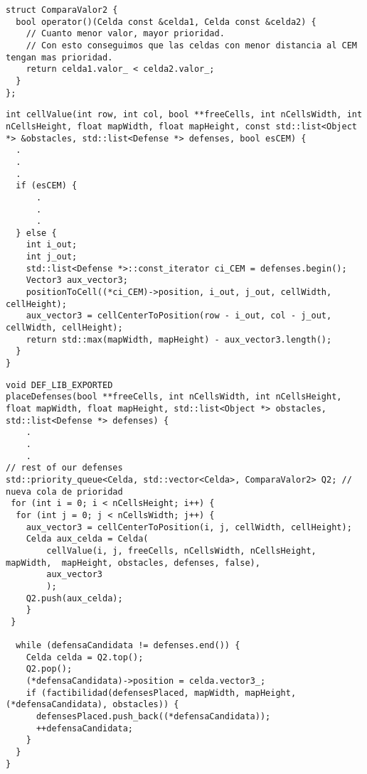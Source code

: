 \begin{lstlisting}
struct ComparaValor2 {
  bool operator()(Celda const &celda1, Celda const &celda2) {
    // Cuanto menor valor, mayor prioridad.
    // Con esto conseguimos que las celdas con menor distancia al CEM tengan mas prioridad.  
    return celda1.valor_ < celda2.valor_;
  }
};

\end{lstlisting}

\begin{lstlisting}
int cellValue(int row, int col, bool **freeCells, int nCellsWidth, int nCellsHeight, float mapWidth, float mapHeight, const std::list<Object *> &obstacles, std::list<Defense *> defenses, bool esCEM) {
  .
  .
  .
  if (esCEM) {
      .
      .
      .
  } else {
    int i_out;
    int j_out;
    std::list<Defense *>::const_iterator ci_CEM = defenses.begin();
    Vector3 aux_vector3;
    positionToCell((*ci_CEM)->position, i_out, j_out, cellWidth, cellHeight);
    aux_vector3 = cellCenterToPosition(row - i_out, col - j_out, cellWidth, cellHeight);
    return std::max(mapWidth, mapHeight) - aux_vector3.length();
  }
}
\end{lstlisting}

\begin{lstlisting}
void DEF_LIB_EXPORTED
placeDefenses(bool **freeCells, int nCellsWidth, int nCellsHeight, float mapWidth, float mapHeight, std::list<Object *> obstacles, std::list<Defense *> defenses) {
    .
    .
    .
// rest of our defenses
std::priority_queue<Celda, std::vector<Celda>, ComparaValor2> Q2; // nueva cola de prioridad
 for (int i = 0; i < nCellsHeight; i++) {
  for (int j = 0; j < nCellsWidth; j++) {
    aux_vector3 = cellCenterToPosition(i, j, cellWidth, cellHeight);
    Celda aux_celda = Celda(
        cellValue(i, j, freeCells, nCellsWidth, nCellsHeight, mapWidth,  mapHeight, obstacles, defenses, false), 
        aux_vector3
        );
    Q2.push(aux_celda);
    }
 }
    
  while (defensaCandidata != defenses.end()) {
    Celda celda = Q2.top();
    Q2.pop();
    (*defensaCandidata)->position = celda.vector3_;
    if (factibilidad(defensesPlaced, mapWidth, mapHeight, (*defensaCandidata), obstacles)) {
      defensesPlaced.push_back((*defensaCandidata));
      ++defensaCandidata;
    }
  }
}
\end{lstlisting}